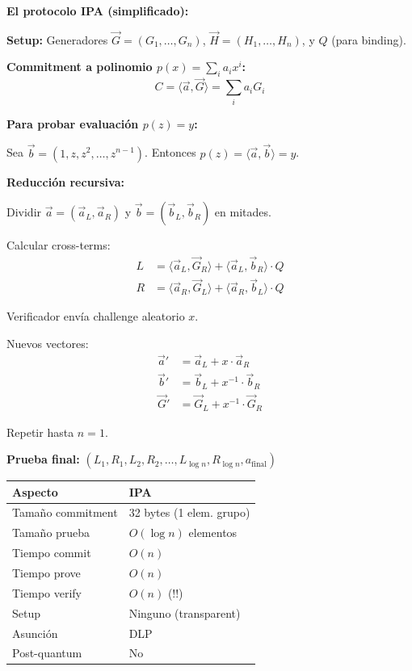 \documentclass[11pt,a4paper,twoside,openright]{book}
\theoremstyle{definition}
\theoremstyle{plain}
\theoremstyle{remark}
\begin{document}
\begin{mathnote}
\textbf{El protocolo IPA (simplificado):}

\textbf{Setup:} Generadores $\vec{G} = (G_1, \ldots, G_n)$, $\vec{H} = (H_1, \ldots, H_n)$, y $Q$ (para binding).

\textbf{Commitment a polinomio $p(x) = \sum_i a_i x^i$:}
\[ C = \langle \vec{a}, \vec{G} \rangle = \sum_i a_i G_i \]

\textbf{Para probar evaluación $p(z) = y$:}

Sea $\vec{b} = (1, z, z^2, \ldots, z^{n-1})$. Entonces $p(z) = \langle \vec{a}, \vec{b} \rangle = y$.

\textbf{Reducción recursiva:}

Dividir $\vec{a} = (\vec{a}_L, \vec{a}_R)$ y $\vec{b} = (\vec{b}_L, \vec{b}_R)$ en mitades.

Calcular cross-terms:
\begin{align}
L &= \langle \vec{a}_L, \vec{G}_R \rangle + \langle \vec{a}_L, \vec{b}_R \rangle \cdot Q \\
R &= \langle \vec{a}_R, \vec{G}_L \rangle + \langle \vec{a}_R, \vec{b}_L \rangle \cdot Q
\end{align}

Verificador envía challenge aleatorio $x$.

Nuevos vectores:
\begin{align}
\vec{a}' &= \vec{a}_L + x \cdot \vec{a}_R \\
\vec{b}' &= \vec{b}_L + x^{-1} \cdot \vec{b}_R \\
\vec{G}' &= \vec{G}_L + x^{-1} \cdot \vec{G}_R
\end{align}

Repetir hasta $n = 1$.

\textbf{Prueba final:} $(L_1, R_1, L_2, R_2, \ldots, L_{\log n}, R_{\log n}, a_{\text{final}})$
\end{mathnote}

\begin{center}
\begin{tabular}{ll}
\toprule
\textbf{Aspecto} & \textbf{IPA} \\
\midrule
Tamaño commitment & 32 bytes (1 elem. grupo) \\
Tamaño prueba & $O(\log n)$ elementos \\
Tiempo commit & $O(n)$ \\
Tiempo prove & $O(n)$ \\
Tiempo verify & $O(n)$ (!!) \\
Setup & Ninguno (transparent) \\
Asunción & DLP \\
Post-quantum & No \\
\bottomrule
\end{tabular}
\end{center}
\end{document}
